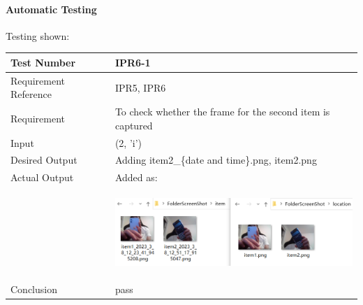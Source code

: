 \documentclass[12pt, titlepage]{article}
\begin{document}
\paragraph{Automatic Testing}{Testing shown:}
\begin{table}[H]
\begin{center}
\begin{tabular}{|l | m{9cm}|}
\hline
  Test Number & IPR6-1\\
  \hline
  Requirement Reference & IPR5, IPR6\\
  \hline
  Requirement & To check whether the frame for the second item is captured\\
  \hline
  Input & (2, 'i')\\
  \hline
  Desired Output & Adding item2\_\{date and time\}.png, item2.png\\
  \hline
  Actual Output & Added as:\\&\includegraphics[width=90mm, height=33mm]{UT3.png}\\
  \hline
  Conclusion & pass\\
  \hline
\end{tabular}
\end{center}           
\end{table}
\end{document}

